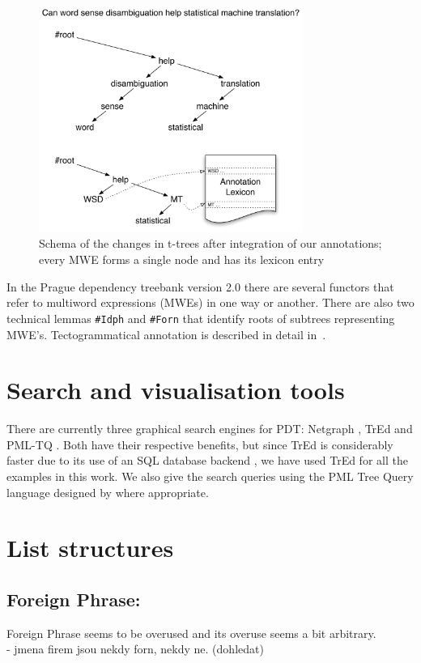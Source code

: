 \begin{figure}[htbp]
   \centering
   \includegraphics[width=3.4in]{images/stromecky.pdf}
   \caption{Schema of the changes in t-trees after integration of our annotations; every MWE forms a single node and has its lexicon entry}
   \label{fig:trees}
\end{figure}


In the Prague dependency treebank version 2.0 \citep{pdt2:2006} there are several functors that refer to multiword expressions (MWEs) in one way or another. There are also two technical lemmas \texttt{\#Idph} and \texttt{\#Forn} that identify roots of subtrees representing MWE's. Tectogrammatical annotation is described in detail in~\citet{mikulova:2006}.


\section{Search and visualisation tools}
\label{sec:pdt:tools}
There are currently three graphical search engines for PDT: Netgraph \citep{mirovsky:2009}, TrEd \citep{pajas:tred} and PML-TQ \citep{pmltq}. Both have their respective benefits, but since TrEd is considerably faster due to its use of an SQL database backend \citep{pmltq}, we have used TrEd for all the examples in this work. We also give the search queries using the PML Tree Query language designed by \citet{pmltq} where appropriate.

\section{List structures}

\subsection{Foreign Phrase: }\label{PDT:Forn}
Foreign Phrase seems to be overused and its overuse seems a bit arbitrary. \\
- jmena firem jsou nekdy forn, nekdy ne. (dohledat)\\

